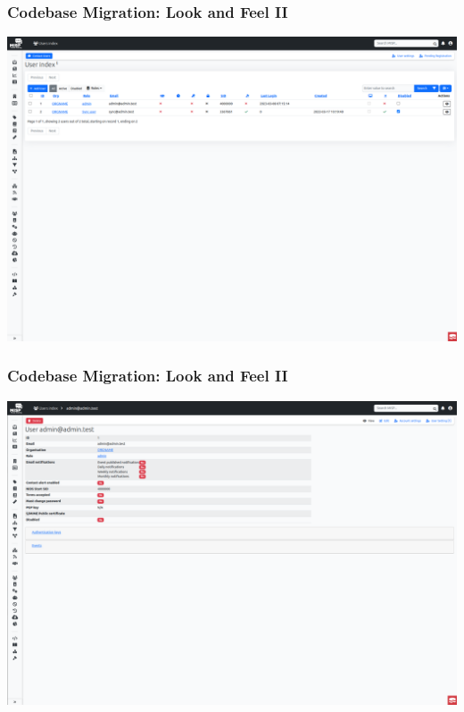 \begin{frame}
    \frametitle{Codebase Migration: Look and Feel II}
    \begin{center}
        \includegraphics[width=1.0\linewidth]{pictures/user-index.png}
    \end{center}
\end{frame}

\begin{frame}
    \frametitle{Codebase Migration: Look and Feel II}
    \begin{center}
        \includegraphics[width=1.0\linewidth]{pictures/user-view.png}
    \end{center}
\end{frame}

